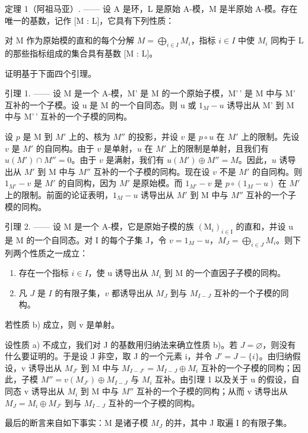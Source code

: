 定理 1（阿祖马亚）. —— 设 A 是环，L 是原始 A-模，M 是半原始 A-模。存在唯一的基数，记作 {[}M : L{]}，它具有下列性质：

对 M 作为原始模的直和的每个分解 \(M = \bigoplus_{i \in I} M_i\)，指标 \(i \in I\) 中使 \(M_i\) 同构于 L 的那些指标组成的集合具有基数 {[}M : L{]}。

证明基于下面四个引理。

引理 1. —— 设 M 是一个 A-模，M' 是 M 的一个原始子模，M'\,' 是 M 中与 M' 互补的一个子模。设 u 是 M 的一个自同态。则 u 或 \(1_{M} - u\) 诱导出从 M' 到 M 中与 M'\,' 互补的一个子模的同构。

设 \(p\) 是 M 到 \(M'\) 上的、核为 \(M''\) 的投影，并设 \(v\) 是 \(p \circ u\) 在 \(M'\) 上的限制。先设 \(v\) 是 \(M'\) 的自同构。由于 \(v\) 是单射，\(u\) 在 \(M'\) 上的限制是单射，且我们有 \(u(M') \cap M'' = 0\)。由于 \(v\) 是满射，我们有 \(u(M') \oplus M'' = M\)。因此，\(u\) 诱导出从 \(M'\) 到 M 中与 \(M''\) 互补的一个子模的同构。现在设 \(v\) 不是 \(M'\) 的自同构。则 \(1_{M'} - v\) 是 \(M'\) 的自同构，因为 \(M'\) 是原始模。而 \(1_{M'} - v\) 是 \(p \circ (1_M - u)\) 在 \(M'\) 上的限制。前面的论证表明，\(1_M - u\) 诱导出从 \(M'\) 到 M 中与 \(M''\) 互补的一个子模的同构。

引理 2. —— 设 M 是一个 A-模，它是原始子模的族 \((\mathrm{M}_{i})_{i\in\mathrm{I}}\) 的直和，并设 u 是 M 的一个自同态。对 I 的每个子集 J，令 \(v=1_{M}-u\)，\(M_{J}=\bigoplus_{i\in J}M_{i}\)。则下列两个性质之一成立：

\begin{enumerate}
\def\labelenumi{\alph{enumi})}
\item
  存在一个指标 \(i \in I\)，使 u 诱导出从 \(M_{i}\) 到 M 的一个直因子子模的同构。
\item
  凡 \(J\) 是 \(I\) 的有限子集，\(v\) 都诱导出从 \(M_J\) 到与 \(M_{I-J}\) 互补的一个子模的同构。
\end{enumerate}

若性质 b) 成立，则 v 是单射。

设性质 a) 不成立，我们对 J 的基数用归纳法来确立性质 b)。若 \(J = \varnothing\)，则没有什么要证明的。于是设 J 非空，取 J 的一个元素 i，并令 \(J' = J - \{i\}\)。由归纳假设，v 诱导出从 \(M_{J'}\) 到 M 中与 \(M_{I-J'} = M_{I-J} \oplus M_i\) 互补的一个子模的同构；因此，子模 \(M'' = v(M_{J'}) \oplus M_{I-J}\) 与 \(M_i\) 互补。由引理 1 以及关于 u 的假设，自同态 v 诱导出从 \(M_i\) 到 M 中与 \(M''\) 互补的一个子模的同构；从而 v 诱导出从 \(M_J = M_i \oplus M_{J'}\) 到与 \(M_{I-J}\) 互补的一个子模的同构。

最后的断言来自如下事实：M 是诸子模 \(M_{J}\) 的并，其中 J 取遍 I 的有限子集。

